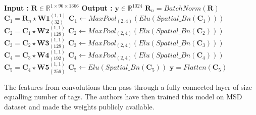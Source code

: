 \begin{algorithm}
  \caption{$\textbf{y}$ = $CHOI\_CNN(\textbf{R})$ }      
  \begin{algorithmic}[1]
   \Statex \textbf{Input :} $\textbf{R} \in \mathbb{R}^{1 \times 96 \times 1366}$
   \Statex \textbf{Output :} $\textbf{y} \in \mathbb{R}^{1024}$ 
   \State $\textbf{R}_{n} = BatchNorm(\textbf{R})$
   \State $\textbf{C}_{1} = \textbf{R}_{n}\star\textbf{W1}_{(32)}^{(1,1)}$ 
   \State $\textbf{C}_{1} \leftarrow MaxPool_{(2,4)}(Elu(Spatial\_Bn(\textbf{C}_{1})))$ 
      \State $\textbf{C}_{2} = \textbf{C}_{1}\star\textbf{W2}_{(128)}^{(1,1)}$ 
   \State $\textbf{C}_{2} \leftarrow MaxPool_{(2,4)}(Elu(Spatial\_Bn(\textbf{C}_{2})))$ 
         \State $\textbf{C}_{3} = \textbf{C}_{2}\star\textbf{W3}_{(128)}^{(1,1)}$ 
   \State $\textbf{C}_{3} \leftarrow MaxPool_{(2,4)}(Elu(Spatial\_Bn(\textbf{C}_{3})))$ 
         \State $\textbf{C}_{4} = \textbf{C}_{3}\star\textbf{W4}_{(192)}^{(1,1)}$ 
   \State $\textbf{C}_{4} \leftarrow MaxPool_{(2,4)}(Elu(Spatial\_Bn(\textbf{C}_{4})))$ 
         \State $\textbf{C}_{5} = \textbf{C}_{4}\star\textbf{W5}_{(256)}^{(1,1)}$ 
   \State $\textbf{C}_{5} \leftarrow Elu(Spatial\_Bn(\textbf{C}_{5}))$ 
   \State $\textbf{y} = Flatten(\textbf{C}_{5})$ 
  \end{algorithmic}
\end{algorithm}
\FloatBarrier

\noindent The features from convolutions then pass through a fully connected layer of size equalling  number of tags. The authors have then trained this model on MSD dataset and made the weights publicly available.


